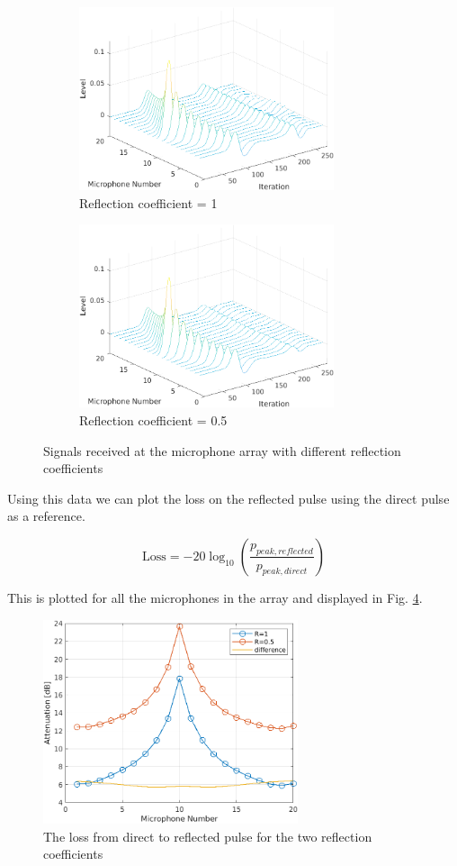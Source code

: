 \documentclass[twocolumn]{article}
\begin{document}
\begin{figure}[H]
    \begin{subfigure}[]{75mm}
        \centering
        \includegraphics[width=75mm]{./Images/3_2_r_1_3D.png}
        \caption{Reflection coefficient = 1}
        \label{fig_3_2_3d_r_1}
    \end{subfigure}
    \begin{subfigure}[]{75mm}
        \centering
        \includegraphics[width=75mm]{./Images/3_2_r_0.5_3D.png}
        \caption{Reflection coefficient = 0.5}
        \label{fig_3_2_3d_r_05}
    \end{subfigure}
    \caption{Signals received at the microphone array with different reflection coefficients}
    \label{fig_3_2_3d}
\end{figure}

Using this data we can plot the loss on the reflected pulse using the direct pulse as a
reference.

\begin{equation}
    \text{Loss} = -20\log_{10}\left(\frac{p_{peak,reflected}}{p_{peak,direct}}\right)
\end{equation}

This is plotted for all the microphones in the array and displayed in Fig. \ref{fig_3_2_plot}.

\begin{figure}[H]
    \centering
    \includegraphics[width=75mm]{./Images/3_2_2D.png}
    \caption{The loss from direct to reflected pulse for the two reflection coefficients}
    \label{fig_3_2_plot}
\end{figure}
\end{document}
